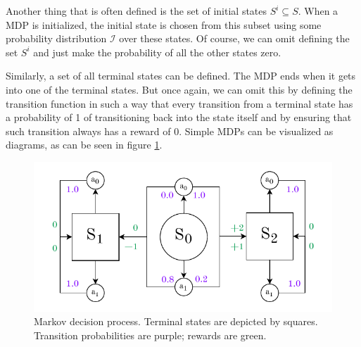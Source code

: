 \documentclass[
  digital,     %
  oneside,     %
  nosansbold,  %
  nocolorbold, %
  lof,         %
  lot,         %
]{fithesis4}
\begin{document}
Another thing that is often defined is the set of initial states $S^i \subseteq S$. When a MDP is initialized, the initial state is chosen from this subset using some probability distribution $\mathcal{I}$ over these states. Of course, we can omit defining the set $S^i$ and just make the probability of all the other states zero. \cite[p. 50]{GDRL}

Similarly, a set of all terminal states can be defined. The MDP ends when it gets into one of the terminal states. But once again, we can omit this by defining the transition function in such a way that every transition from a terminal state has a probability of 1 of transitioning back into the state itself and by ensuring that such transition always has a reward of 0.
Simple MDPs can be visualized as diagrams, as can be seen in figure \ref{fig:mdp}.

\begin{figure}
    \centering
    \includegraphics[width=1\linewidth]{diagrams/mdp.pdf}
    \caption{Markov decision process. Terminal states are depicted by squares. Transition probabilities are purple; rewards are green.}
    \label{fig:mdp}
\end{figure}
\end{document}
